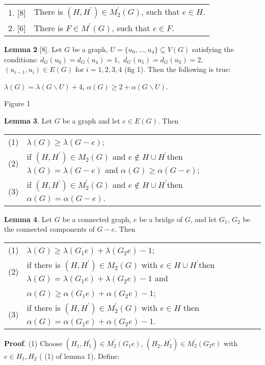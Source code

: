 \documentclass{article}
\begin{document}
\begin{tabular}{ll}
1. [8] & There is $(H,H^{\prime })\in M_{2}^{\prime }(G)$, such that $e\in H$. \\ 
2. [6] & There is $F\in M^{\prime }(G)$, such that $e\in F$.\end{tabular}

\textbf{Lemma 2 }[8]. Let $G$ be a graph, $U=\{u_{0},...,u_{4}\}\subseteq
V(G)$ satisfying the conditions: $d_{G}(u_{0})=d_{G}(u_{4})=1,$ $d_{G}(u_{1})=d_{G}(u_{3})=2,$ $(u_{i-1},u_{i})\in E(G)$ for $i=1,2,3,4$ (fig
1). Then the following is true:

\begin{center}
$\lambda (G)=\lambda (G\backslash U)+4$, $\alpha (G)\geq 2+\alpha
(G\backslash U)$.


Figure 1\bigskip
\end{center}

\textbf{Lemma 3}. Let $G$ be a graph and let $e\in E(G)$. Then

\begin{tabular}{ll}
(1) & $\lambda (G)\geq \lambda (G-e)$; \\ 
(2) & if $(H,H^{\prime })\in M_{2}(G)$ and $e\notin H\cup H^{\prime }$then $\lambda (G)=\lambda (G-e)$ and $\alpha (G)\geq \alpha (G-e)$; \\ 
(3) & if $(H,H^{\prime })\in M_{2}^{\prime }(G)$ and $e\notin H\cup
H^{\prime }$then $\alpha (G)=\alpha (G-e)$.\end{tabular}

\textbf{Lemma 4}. Let $G$ be a connected graph, $e$ be a bridge of $G$, and
let $G_{1}$, $G_{2}$ be the connected components of $G-e$. Then

\begin{tabular}{ll}
(1) & $\lambda (G)\geq \lambda (G_{1}e)+\lambda (G_{2}e)-1$; \\ 
(2) & if there is $(H,H^{\prime })\in M_{2}(G)$ with $e\in H\cup H^{\prime }$then $\lambda (G)=\lambda (G_{1}e)+\lambda (G_{2}e)-1$ and \\ 
& $\alpha (G)\geq \alpha (G_{1}e)+\alpha (G_{2}e)-1$; \\ 
(3) & if there is $(H,H^{\prime })\in M_{2}^{\prime }(G)$ with $e\in H$ then 
$\alpha (G)=\alpha (G_{1}e)+\alpha (G_{2}e)-1$.\end{tabular}

\textbf{Proof}. (1) Choose $(H_{1},H_{1}^{\prime })\in M_{2}^{\prime
}(G_{1}e)$, $(H_{2},H_{2}^{\prime })\in M_{2}^{\prime }(G_{2}e)$ with $e\in
H_{1},H_{2}$ ( (1) of lemma 1). Define:
\end{document}
